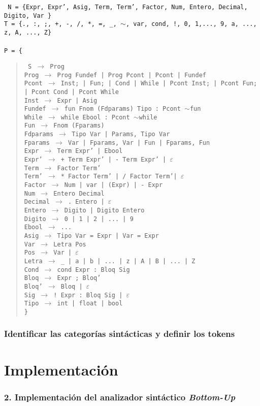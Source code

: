 \documentclass[12pt]{article}
\begin{document}
\noindent
\noindent
\texttt{
  \noindent
N = \{Expr, Expr', Asig, Term, Term', Factor, Num, Entero, Decimal, Digito, Var \}\\
T = \{., :, ;, +, -, /, *, =, \_, $\sim$, var, cond, !, 0, 1,..., 9, a, ..., z, A, ..., Z\}\\ \\ 
P = \{}
\begin{quote}
  \texttt{
    S $\to$ Prog\\
    Prog $\to$ Prog Fundef | Prog Pcont | Pcont | Fundef\\
    Pcont $\to$ Inst; | Fun; | Cond | While | Pcont Inst; | Pcont Fun; | Pcont Cond | Pcont While\\
    Inst $\to$ Expr | Asig\\
    Fundef $\to$ fun Fnom (Fdparams) Tipo : Pcont $\sim$fun\\
    While $\to$ while Ebool : Pcont $\sim$while\\    
    Fun $\to$ Fnom (Fparams)\\
    Fdparams $\to$ Tipo Var | Params, Tipo Var\\
    Fparams $\to$ Var | Fparams, Var | Fun | Fparams, Fun\\
    Expr  $\to$ Term Expr' | Ebool \\
    Expr' $\to$ + Term Expr' | - Term Expr' | $\varepsilon$ \\
    Term  $\to$ Factor Term' \\
    Term' $\to$ * Factor Term' | / Factor Term'| $\varepsilon$ \\
    Factor $\to$ Num | var | (Expr) | - Expr \\
    Num $\to$ Entero Decimal \\
    Decimal $\to$ . Entero | $\varepsilon$ \\
    Entero $\to$ Digito | Digito Entero \\
    Digito $\to$ 0 | 1 | 2 | ... | 9 \\
    Ebool $\to$ ... \\
    Asig $\to$ Tipo Var = Expr | Var = Expr \\
    Var  $\to$ Letra Pos \\
    Pos  $\to$ Var | $\varepsilon$ \\
    Letra $\to$ \_ | a | b | ... | z | A | B | ... | Z \\
    Cond $\to$ cond Expr : Bloq Sig \\
    Bloq $\to$ Expr ; Bloq'\\
    Bloq' $\to$ Bloq | $\varepsilon$\\ 
    Sig $\to$ ! Expr : Bloq Sig | $\varepsilon$ \\
    Tipo $\to$ int | float | bool \\
    \}
}
 
\end{quote}

\subsubsection*{Identificar las categorías sintácticas y definir los tokens}

\section{Implementación}
\subsubsection*{2. Implementación del analizador sintáctico \textit{Bottom-Up}}
\end{document}
